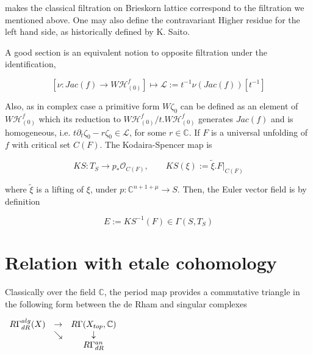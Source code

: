 \documentclass[12pt,twoside]{amsart}
\begin{document}
\vspace{0.5cm}

\noindent
makes the classical filtration on Brieskorn lattice correspond to the filtration we mentioned above. One may also define the contravariant Higher residue for the left hand side, as historically defined by K. Saito.

\vspace{0.5cm}

\noindent
A good section is an equivalent notion to opposite filtration under the identification, 

\[ [\nu :Jac(f) \to  W\mathcal{H}_{(0)}^f] \mapsto \mathcal{L}:=t^{-1}\nu(Jac(f))[t^{-1}] \]

\vspace{0.5cm}

\noindent
Also, as in complex case a primitive form $W\zeta_0$ can be defined as an element of $ W\mathcal{H}_{(0)}^f$ which its reduction to $ W\mathcal{H}_{(0)}^f/t. W\mathcal{H}_{(0)}^f$ generates $Jac(f)$ and is homogeneous, i.e. $t\partial_t \zeta_0-r \zeta_0 \in \mathcal{L}$, for some $r \in \mathbb{C}$. If $F$ is a universal unfolding of $f$ with critical set $C(F)$. The Kodaira-Spencer map is

\[ KS: T_S \to p_*\mathcal{O}_{C(F)} , \qquad KS(\xi):=\tilde{\xi} .F|_{C(F)} \]

\vspace{0.5cm}

\noindent
where $\tilde{\xi}$ is a lifting of $\xi$, under $p:\mathbb{C}^{n+1+\mu} \to S$. Then, the Euler vector field is by definition
 
\[
E:=KS^{-1}(F) \in \Gamma(S,T_S) \]

\vspace{0.5cm}

\section{Relation with etale cohomology}

\vspace{0.5cm}

Classically over the field $\mathbb{C}$, the period map provides a commutative triangle in the following form between the de Rham and singular complexes

\vspace{0.5cm}

\begin{center}
$\begin{array}[c]{ccc}
R\Gamma_{dR}^{alg}(X)&\rightarrow& R\Gamma(X_{top},\mathbb{C})\\
&\searrow&\downarrow\\
&&R\Gamma_{dR}^{an}
\end{array}$
\end{center}
\end{document}
